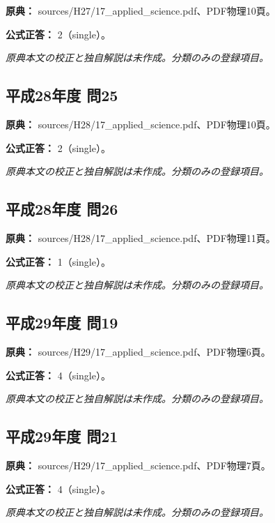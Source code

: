 \noindent\textbf{原典：} sources/H27/17\_applied\_science.pdf、PDF物理10頁。

\textbf{公式正答：} 2（single）。

\par\textit{原典本文の校正と独自解説は未作成。分類のみの登録項目。}

\subsection{平成28年度 問25}
\label{q:h28-reg-applied-25}

\noindent\textbf{原典：} sources/H28/17\_applied\_science.pdf、PDF物理10頁。

\textbf{公式正答：} 2（single）。

\par\textit{原典本文の校正と独自解説は未作成。分類のみの登録項目。}

\subsection{平成28年度 問26}
\label{q:h28-reg-applied-26}

\noindent\textbf{原典：} sources/H28/17\_applied\_science.pdf、PDF物理11頁。

\textbf{公式正答：} 1（single）。

\par\textit{原典本文の校正と独自解説は未作成。分類のみの登録項目。}

\subsection{平成29年度 問19}
\label{q:h29-reg-applied-19}

\noindent\textbf{原典：} sources/H29/17\_applied\_science.pdf、PDF物理6頁。

\textbf{公式正答：} 4（single）。

\par\textit{原典本文の校正と独自解説は未作成。分類のみの登録項目。}

\subsection{平成29年度 問21}
\label{q:h29-reg-applied-21}

\noindent\textbf{原典：} sources/H29/17\_applied\_science.pdf、PDF物理7頁。

\textbf{公式正答：} 4（single）。

\par\textit{原典本文の校正と独自解説は未作成。分類のみの登録項目。}

